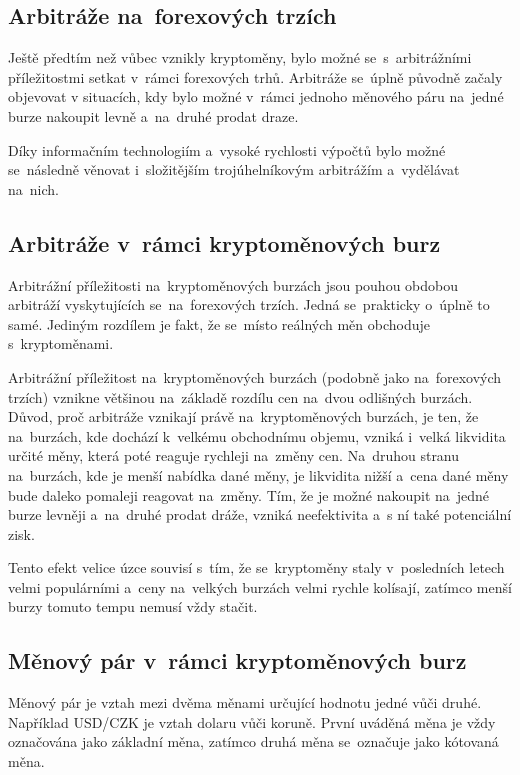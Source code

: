 \documentclass[thesis=B,czech]{FITthesis}[2019/03/21]
\begin{document}
\subsection{Arbitráže na~forexových trzích}
Ještě předtím než vůbec vznikly kryptoměny, bylo možné se~s~arbitrážními příležitostmi setkat v~rámci forexových trhů. Arbitráže se~úplně původně začaly objevovat v situacích, kdy bylo možné v~rámci jednoho měnového páru na~jedné burze nakoupit levně a~na~druhé prodat draze. 

Díky informačním technologiím a~vysoké rychlosti výpočtů bylo možné se~následně věnovat i~složitějším trojúhelníkovým arbitrážím a~vydělávat \linebreak na~nich. \cite{investopedia_forex_arbitrage}

\subsection{Arbitráže v~rámci kryptoměnových burz}
Arbitrážní příležitosti na~kryptoměnových burzách jsou pouhou obdobou arbitráží vyskytujících se~na~forexových trzích. Jedná se~prakticky o~úplně to samé. Jediným rozdílem je fakt, že se~místo reálných měn obchoduje s~kryptoměnami. 

Arbitrážní příležitost na~kryptoměnových burzách (podobně jako na~forexových trzích) vznikne většinou na~základě rozdílu cen na~dvou odlišných burzách. Důvod, proč arbitráže vznikají právě na~kryptoměnových burzách, je ten, že na~burzách, kde dochází k~velkému obchodnímu objemu, vzniká i~velká likvidita určité měny, která poté reaguje rychleji na~změny cen. Na~druhou stranu na~burzách, kde je menší nabídka dané měny, je likvidita nižší a~cena dané měny bude daleko pomaleji reagovat na~změny. Tím, že je možné nakoupit na~jedné burze levněji a~na~druhé prodat dráže, vzniká neefektivita a~s ní také potenciální zisk.

Tento efekt velice úzce souvisí s~tím, že se~kryptoměny staly v~posledních letech velmi populárními a~ceny na~velkých burzách velmi rychle kolísají, zatímco menší burzy tomuto tempu nemusí vždy stačit. \cite{finder}

\subsection{Měnový pár v~rámci kryptoměnových burz}
Měnový pár je vztah mezi dvěma měnami určující hodnotu jedné vůči druhé. Například USD/CZK je vztah dolaru vůči koruně. První uváděná měna je vždy označována jako základní měna, zatímco druhá měna se~označuje jako kótovaná měna. \cite{Capital_menovy_par} 
\end{document}
